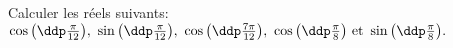 
\begin{exercice}  \;
Calculer les r\'eels suivants: $\cos{\left(\ddp\frac{\pi}{12}\right)},\ \sin{\left(\ddp\frac{\pi}{12}\right)},\ \cos{\left(\ddp\frac{7\pi}{12}\right)},\ \cos{\left(\ddp\frac{\pi}{8}\right)}\ \hbox{et}\ \sin{\left(\ddp\frac{\pi}{8}\right)} .$
\end{exercice}